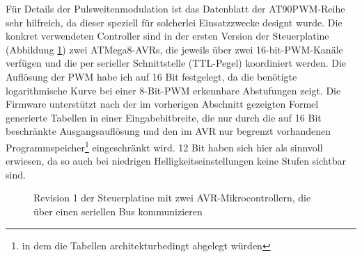 \documentclass[12pt,a4paper,notitlepage]{article}
\begin{document}
Für Details der Pulsweitenmodulation ist das Datenblatt der AT90PWM-Reihe sehr hilfreich, da dieser speziell für solcherlei Einsatzzwecke designt wurde\cite{ATMEL2}. Die konkret verwendeten Controller sind in der ersten Version der Steuerplatine (Abbildung \ref{controller_rev1}) zwei ATMega8-AVRs, die jeweils über zwei 16-bit-PWM-Kanäle verfügen und die per serieller Schnittstelle (TTL-Pegel) koordiniert werden. Die Auflösung der PWM habe ich auf 16 Bit festgelegt, da die benötigte logarithmische Kurve bei einer 8-Bit-PWM erkennbare Abstufungen zeigt. Die Firmware unterstützt nach der im vorherigen Abschnitt %
gezeigten Formel generierte Tabellen in einer Eingabebitbreite, die nur durch die auf 16 Bit beschränkte Ausgangsauflösung und den im AVR nur begrenzt vorhandenen Programmspeicher\footnote{in dem die Tabellen architekturbedingt abgelegt würden}  eingeschränkt wird. 12 Bit haben sich hier als sinnvoll erwiesen, da so auch bei %
niedrigen Helligkeitseinstellungen keine Stufen sichtbar sind.

\begin{figure}
\centering
{}
\label{controller_rev1}
\caption{Revision 1 der Steuerplatine mit zwei AVR-Mikrocontrollern, die über einen seriellen Bus kommunizieren}
\end{figure}
\end{document}
